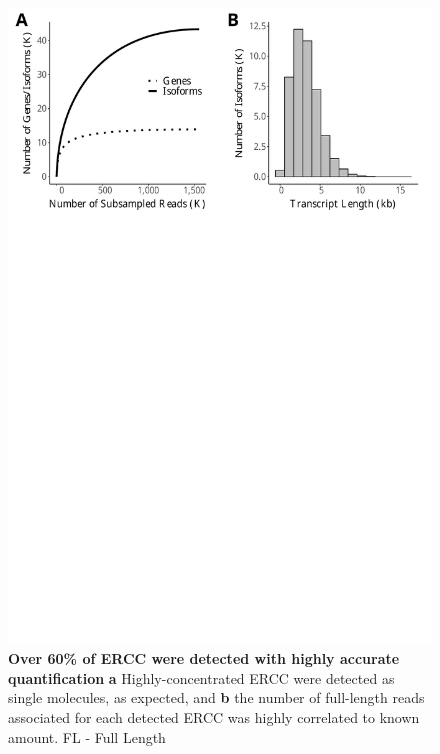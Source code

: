 \begin{figure}[htp]
	\begin{center}
		\includegraphics[page=3,trim={0 25cm 0 0},clip,scale = 0.55]{Figures/IsoSeqWholeTranscriptome.pdf}
	\end{center}
	\captionsetup{width=0.95\textwidth}
	\caption[Detection of ERCC standards in Whole Transcriptome Iso-Seq]%
	{\textbf{Over 60\% of ERCC were detected with highly accurate quantification} \textbf{a} Highly-concentrated ERCC were detected as single molecules, as expected, and \textbf{b} the number of full-length reads associated for each detected ERCC was highly correlated to known amount. FL - Full Length}
	\label{fig:isoseq_whole_ercc}
\end{figure}


